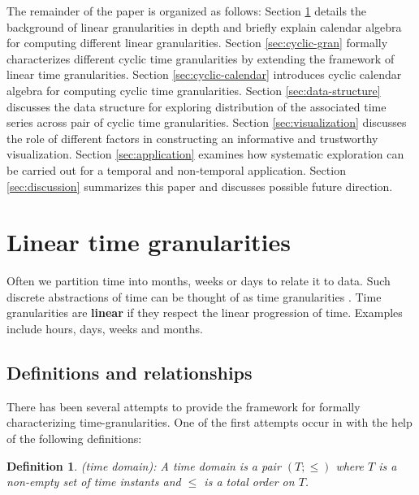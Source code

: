 \documentclass[12pt]{article}
\begin{document}
The remainder of the paper is organized as follows: Section \ref{sec:linear-time} details the background of linear granularities in depth and briefly explain calendar algebra for computing different linear granularities. Section \ref{sec:cyclic-gran} formally characterizes different cyclic time granularities by extending the framework of linear time granularities. Section \ref{sec:cyclic-calendar} introduces cyclic calendar algebra for computing cyclic time granularities. Section \ref{sec:data-structure} discusses the data structure for exploring distribution of the associated time series across pair of cyclic time granularities. Section \ref{sec:visualization} discusses the role of different factors in constructing an informative and trustworthy visualization. Section \ref{sec:application} examines how systematic exploration can be carried out for a temporal and non-temporal application. Section \ref{sec:discussion} summarizes this paper and discusses possible future direction.

\hypertarget{sec:linear-time}{%
\section{Linear time granularities}\label{sec:linear-time}}

Often we partition time into months, weeks or days to relate it to data. Such discrete abstractions of time can be thought of as time granularities \citep{aigner2011visualization}. Time granularities are \textbf{linear} if they respect the linear progression of time. Examples include hours, days, weeks and months.

\hypertarget{definitions-and-relationships}{%
\subsection{Definitions and relationships}\label{definitions-and-relationships}}

There has been several attempts to provide the framework for formally characterizing time-granularities. One of the first attempts occur in \citet{Bettini1998-ed} with the help of the following definitions:

\newtheorem{definition}{Definition}

\begin{definition}\label{def:definition}
(time domain): A time domain is a pair $(T; \le)$ where $T$ is a non-empty set of time instants and $\le$ is a total order on $T$.
\end{definition}
\end{document}
